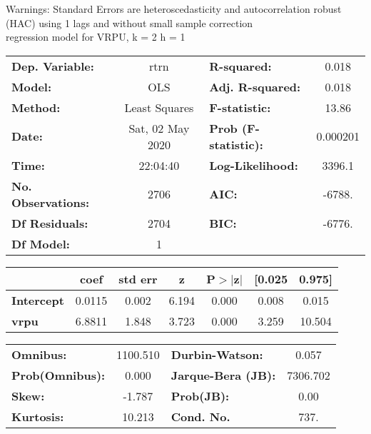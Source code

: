 Warnings: \newline
 [1] Standard Errors are heteroscedasticity and autocorrelation robust (HAC) using 1 lags and without small sample correction\\ 

regression model for VRPU, k = 2 h = 1\begin{center}
\begin{tabular}{lclc}
\toprule
\textbf{Dep. Variable:}    &       rtrn       & \textbf{  R-squared:         } &     0.018   \\
\textbf{Model:}            &       OLS        & \textbf{  Adj. R-squared:    } &     0.018   \\
\textbf{Method:}           &  Least Squares   & \textbf{  F-statistic:       } &     13.86   \\
\textbf{Date:}             & Sat, 02 May 2020 & \textbf{  Prob (F-statistic):} &  0.000201   \\
\textbf{Time:}             &     22:04:40     & \textbf{  Log-Likelihood:    } &    3396.1   \\
\textbf{No. Observations:} &        2706      & \textbf{  AIC:               } &    -6788.   \\
\textbf{Df Residuals:}     &        2704      & \textbf{  BIC:               } &    -6776.   \\
\textbf{Df Model:}         &           1      & \textbf{                     } &             \\
\bottomrule
\end{tabular}
\begin{tabular}{lcccccc}
                   & \textbf{coef} & \textbf{std err} & \textbf{z} & \textbf{P$> |$z$|$} & \textbf{[0.025} & \textbf{0.975]}  \\
\midrule
\textbf{Intercept} &       0.0115  &        0.002     &     6.194  &         0.000        &        0.008    &        0.015     \\
\textbf{vrpu}      &       6.8811  &        1.848     &     3.723  &         0.000        &        3.259    &       10.504     \\
\bottomrule
\end{tabular}
\begin{tabular}{lclc}
\textbf{Omnibus:}       & 1100.510 & \textbf{  Durbin-Watson:     } &    0.057  \\
\textbf{Prob(Omnibus):} &   0.000  & \textbf{  Jarque-Bera (JB):  } & 7306.702  \\
\textbf{Skew:}          &  -1.787  & \textbf{  Prob(JB):          } &     0.00  \\
\textbf{Kurtosis:}      &  10.213  & \textbf{  Cond. No.          } &     737.  \\
\bottomrule
\end{tabular}
\end{center}

